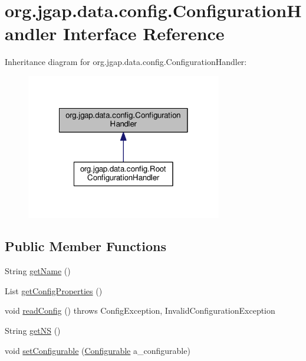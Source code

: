 \hypertarget{interfaceorg_1_1jgap_1_1data_1_1config_1_1_configuration_handler}{\section{org.\-jgap.\-data.\-config.\-Configuration\-Handler Interface Reference}
\label{interfaceorg_1_1jgap_1_1data_1_1config_1_1_configuration_handler}
}


Inheritance diagram for org.\-jgap.\-data.\-config.\-Configuration\-Handler\-:
\nopagebreak
\begin{figure}[H]
\begin{center}
\leavevmode
\includegraphics[width=242pt]{interfaceorg_1_1jgap_1_1data_1_1config_1_1_configuration_handler__inherit__graph}
\end{center}
\end{figure}
\subsection*{Public Member Functions}
\begin{DoxyCompactItemize}
\item 
String \hyperlink{interfaceorg_1_1jgap_1_1data_1_1config_1_1_configuration_handler_a37c99182a454a723a40dba5da3a0b569}{get\-Name} ()
\item 
List \hyperlink{interfaceorg_1_1jgap_1_1data_1_1config_1_1_configuration_handler_afab2c248c1508f4c5aff07476d14535c}{get\-Config\-Properties} ()
\item 
void \hyperlink{interfaceorg_1_1jgap_1_1data_1_1config_1_1_configuration_handler_a36e474a6166d082c375cf521e0174804}{read\-Config} ()  throws Config\-Exception, Invalid\-Configuration\-Exception
\item 
String \hyperlink{interfaceorg_1_1jgap_1_1data_1_1config_1_1_configuration_handler_a2ecd95a1925db767c89f887b3e585b04}{get\-N\-S} ()
\item 
void \hyperlink{interfaceorg_1_1jgap_1_1data_1_1config_1_1_configuration_handler_a831ec614e3a75bb8c8ef395877d21178}{set\-Configurable} (\hyperlink{interfaceorg_1_1jgap_1_1data_1_1config_1_1_configurable}{Configurable} a\-\_\-configurable)
\end{DoxyCompactItemize}
